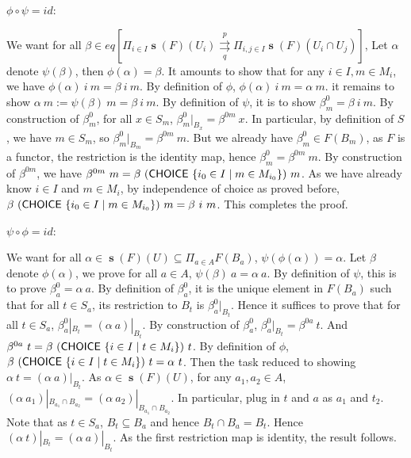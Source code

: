 \documentclass[a4paper]{article}
\DeclareMathOperator{\s}{\mathbf s}
\DeclareMathOperator{\CHOICE}{\sf CHOICE}
\begin{document}
$\phi\circ \psi = id$:

We want for all $\beta\in eq[\Pi_{i\in I}\s(F)(U_i)\overset{p}{\underset{q}\rightrightarrows}\Pi_{i,j\in I}\s(F)(U_i\cap U_j)]$, Let $\alpha$ denote $\psi (\beta)$, then $\phi(\alpha)=\beta$. It amounts to show that for any $i\in I,m\in M_i$, we have $\phi(\alpha) \ i \ m = \beta\ i \ m$. By definition of $\phi$, $\phi (\alpha) \ i \ m = \alpha \ m$. it remains to show $\alpha \ m :=  \psi (\beta) \ m = \beta\ i \ m$. By definition of $\psi$, it is to show $\beta^0_m=\beta \ i \ m$. By construction of $\beta^0_m$, for all $x\in S_m$, $\beta^0_m|_{B_x}= \beta^{0m}\ x$. In particular, by definition of $S$, we have $m\in S_m$, so $\beta^0_m|_{B_m}= \beta^{0m}\ m$. But we already have $\beta^0_m\in F(B_m)$, as $F$ is a functor, the restriction is the identity map, hence $\beta^0_m= \beta^{0m} \ m$. By construction of $\beta^{0m}$, we have $\beta^{0m} \ m = \beta\ (\CHOICE \ \{i_0\in I\mid m\in M_{i_0}\}) \ m$. As we have already know $i\in I$ and $m\in M_i$, by independence of choice as proved before, $\beta\ (\CHOICE \ \{i_0\in I\mid m\in M_{i_0}\}) \ m = \beta \ i \ m$. This completes the proof. 


$\psi\circ \phi = id$:

We want for all $\alpha\in \s(F)(U)\subseteq \Pi_{a\in A}F(B_a)$, $\psi(\phi(\alpha))=\alpha$. Let $\beta$ denote $\phi(\alpha)$, we prove for all $a\in A$, $\psi(\beta) \ a=\alpha \ a$. By definition of $\psi$, this is to prove $\beta^0_a = \alpha \ a$. By definition of $\beta^0_a$, it is the unique element in $F(B_a)$ such that for all $t\in S_a$, its restriction to $B_t$ is  $\beta^0_a|_{B_t}$. Hence it suffices to prove that for all $t\in S_a$, $\beta^0_a|_{B_t} = (\alpha \ a)|_{B_t}$. By construction of $\beta^0_a$, $\beta^0_a|_{B_t} = \beta^{0a} \ t$. And $\beta^{0a}\ t = \beta \ (\CHOICE \ \{i\in I\mid t\in M_i\}) \ t$. By definition of $\phi$, $\beta \ (\CHOICE \ \{i\in I\mid t\in M_i\}) \ t = \alpha \ t$. Then the task reduced to showing $\alpha \ t = (\alpha \ a)|_{B_t}$. As $\alpha \in \s(F)(U)$, for any $a_1,a_2\in A$, $(\alpha \ a_1)|_{B_{a_1}\cap B_{a_2}}= (\alpha \ a_2)|_{B_{a_1}\cap B_{a_2}}$. In particular, plug in $t$ and $a$ as $a_1$ and $t_2$. Note that as $t\in S_a$, $B_t\subseteq B_a$ and hence $B_t\cap B_a = B_t$. Hence $(\alpha \ t)|_{B_t}= (\alpha \ a)|_{B_t}$. As the first restriction map is identity, the result follows.
\end{document}
